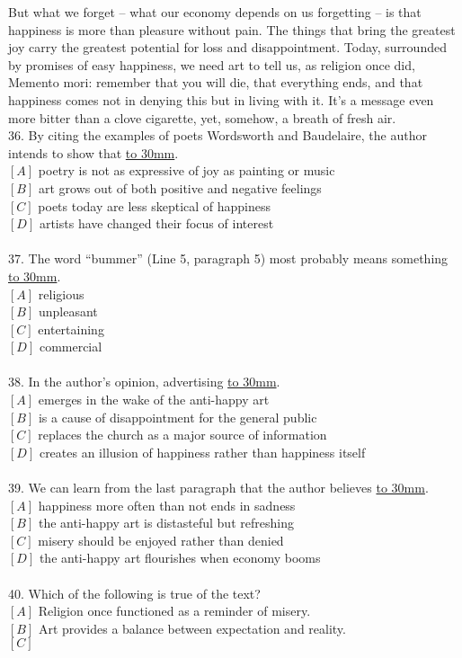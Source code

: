 \documentclass[a4paper]{article}
\begin{document}
\par
But what we forget -- what our economy depends on us forgetting -- is that happiness is more than pleasure without pain. The things that bring the greatest joy carry the greatest potential for loss and disappointment. Today, surrounded by promises of easy happiness, we need art to tell us, as religion once did, Memento mori: remember that you will die, that everything ends, and that happiness comes not in denying this but in living with it. It’s a message even more bitter than a clove cigarette, yet, somehow, a breath of fresh air.
\\36.	By citing the examples of poets Wordsworth and Baudelaire, the author intends to show that \underline{\hbox to 30mm{}}.\\$[A]$ poetry is not as expressive of joy as painting or music\\$[B]$ art grows out of both positive and negative feelings\\$[C]$ poets today are less skeptical of happiness\\$[D]$ artists have changed their focus of interest\\\\37.	The word “bummer” (Line 5, paragraph 5) most probably means something \underline{\hbox to 30mm{}}.\\$[A]$ religious\\$[B]$ unpleasant\\$[C]$ entertaining\\$[D]$ commercial\\\\38.	In the author’s opinion, advertising \underline{\hbox to 30mm{}}.\\$[A]$ emerges in the wake of the anti-happy art\\$[B]$ is a cause of disappointment for the general public\\$[C]$ replaces the church as a major source of information\\$[D]$ creates an illusion of happiness rather than happiness itself\\\\39.	We can learn from the last paragraph that the author believes \underline{\hbox to 30mm{}}.\\$[A]$ happiness more often than not ends in sadness\\$[B]$ the anti-happy art is distasteful but refreshing\\$[C]$ misery should be enjoyed rather than denied\\$[D]$ the anti-happy art flourishes when economy booms\\\\40.	Which of the following is true of the text?\\$[A]$ Religion once functioned as a reminder of misery.\\$[B]$ Art provides a balance between expectation and reality.\\$[C]$ 
\end{document}
